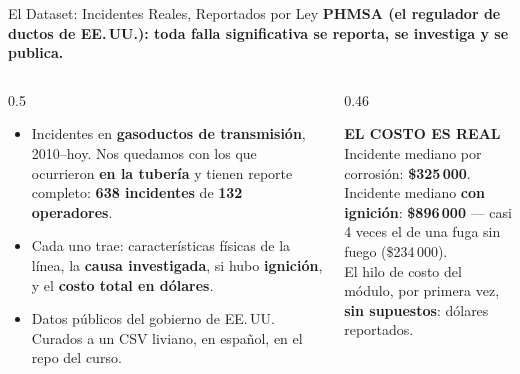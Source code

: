 \documentclass[aspectratio=169, 11pt]{beamer}
\begin{document}
\begin{frame}[shrink=8]{El Dataset: Incidentes Reales, Reportados por Ley}
  \vspace{-4pt}
  {\small\color{arcaDark}\bfseries
    PHMSA (el regulador de ductos de EE.\,UU.): toda falla significativa se reporta, se investiga y se publica.}

  \vspace{8pt}
  \begin{columns}[T]
    \begin{column}{0.5\textwidth}
      {\footnotesize\color{textMuted}
      \begin{itemize}\setlength{\itemsep}{5pt}
        \item[{\color{arcaRed}\scriptsize\faDatabase}]
          Incidentes en \textbf{gasoductos de transmisión},
          2010--hoy. Nos quedamos con los que ocurrieron
          \textbf{en la tubería} y tienen reporte completo:
          \textbf{638 incidentes} de \textbf{132 operadores}.
        \item[{\color{arcaRed}\scriptsize\faSearch}]
          Cada uno trae: características físicas de la línea,
          la \textbf{causa investigada}, si hubo \textbf{ignición},
          y el \textbf{costo total en dólares}.
        \item[{\color{codeGreen}\scriptsize\faCheck}]
          Datos públicos del gobierno de EE.\,UU.
          Curados a un CSV liviano, en español, en el repo del curso.
      \end{itemize}
      }
    \end{column}
    \begin{column}{0.46\textwidth}
      \begin{tcolorbox}[colback=arcaGray, colframe=arcaRed, boxrule=0pt, leftrule=3pt,
        arc=3pt, left=6pt, right=6pt, top=5pt, bottom=5pt]
        {\scriptsize\color{arcaDark}\bfseries\faDollarSign\hspace{4pt}EL COSTO ES REAL}\\[4pt]
        {\scriptsize\color{textMuted}
          Incidente mediano por corrosión: \textbf{\$325\,000}.\\[2pt]
          Incidente mediano \textbf{con ignición}: \textbf{\$896\,000}
          --- casi 4 veces el de una fuga sin fuego (\$234\,000).\\[3pt]
          El hilo de costo del módulo, por primera vez,
          \textbf{sin supuestos}: dólares reportados.}
      \end{tcolorbox}
    \end{column}
  \end{columns}
\end{frame}
\end{document}
